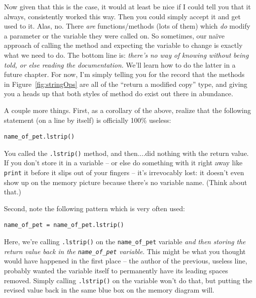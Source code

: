 Now given that this is the case, it would at least be nice if I could tell you
that it always, consistently worked this way. Then you could simply accept it
and get used to it. Alas, no. There \textit{are} functions/methods (lots of
them) which \textit{do} modify a parameter or the variable they were called on.
So sometimes, our na\"{i}ve approach of calling the method and expecting the
variable to change is exactly what we need to do. The bottom line is:
\textit{there's no way of knowing without being told, or else reading the
documentation.} We'll learn how to do the latter in a future chapter. For now,
I'm simply telling you for the record that the methods in
Figure~\ref{fig:stringOps} are all of the ``return a modified copy'' type, and
giving you a heads up that both styles of method do exist out there in
abundance.

A couple more things. First, as a corollary of the above, realize that the
following statement (on a line by itself) is officially 100\% useless:

\begin{Verbatim}[fontsize=\small,samepage=true,frame=single,framesep=3mm]
name_of_pet.lstrip()
\end{Verbatim}

You called the \texttt{.lstrip()} method, and then....did nothing with the
return value. If you don't store it in a variable -- or else do something with
it right away like \texttt{print} it before it slips out of your fingers --
it's irrevocably lost: it doesn't even show up on the memory picture because
there's no variable name. (Think about that.)

Second, note the following pattern which is very often used:

\begin{Verbatim}[fontsize=\small,samepage=true,frame=single,framesep=3mm]
name_of_pet = name_of_pet.lstrip()
\end{Verbatim}

Here, we're calling \texttt{.lstrip()} on the \texttt{name\_of\_pet} variable
\textit{and then storing the return value back in the \texttt{name\_of\_pet}
variable}. This might be what you thought would have happened in the first
place -- the author of the previous, useless line, probably wanted the variable
itself to permanently have its leading spaces removed. Simply calling
\texttt{.lstrip()} on the variable won't do that, but putting the revised value
back in the same blue box on the memory diagram will.
